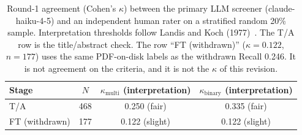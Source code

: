 \begin{table}[htbp]
\centering
\caption{Round-1 agreement (Cohen's $\kappa$) between the primary LLM screener (claude-haiku-4-5) and an independent human rater on a stratified random 20\% sample. Interpretation thresholds follow Landis and Koch (1977)~\cite{landiskoch1977}. The T/A row is the title/abstract check. The row ``FT (withdrawn)'' ($\kappa = 0.122$, $n=177$) uses the same PDF-on-disk labels as the withdrawn Recall 0.246. It is not agreement on the criteria, and it is not the $\kappa$ of this revision.}
\label{tab:human-kappa-results}
\begin{tabular}{lccc}
\toprule
Stage & $N$ & $\kappa_{\text{multi}}$ (interpretation) & $\kappa_{\text{binary}}$ (interpretation) \\
\midrule
T/A & 468 & 0.250 (fair) & 0.335 (fair) \\
FT (withdrawn) & 177 & 0.122 (slight) & 0.122 (slight) \\
\bottomrule
\end{tabular}
\end{table}